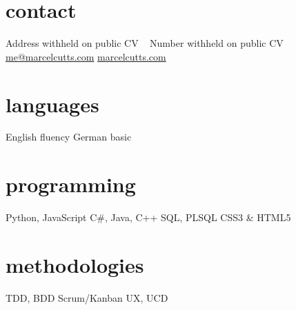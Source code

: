 \documentclass[]{friggeri-cv} %
\begin{document}
\begin{asidenoheader} %
\section{contact}
Address withheld on public CV
~
Number withheld on public CV
~
\href{mailto:me@marcelcutts.com}{me@marcelcutts.com}
\href{http://www.marcelcutts.com}{marcelcutts.com}
\section{languages}
English fluency
German basic
\section{programming}
Python, JavaScript
C\#, Java, C++
SQL, PLSQL
CSS3 \& HTML5
\section{methodologies}
TDD, BDD
Scrum/Kanban
UX, UCD
\end{asidenoheader}
\end{document}
